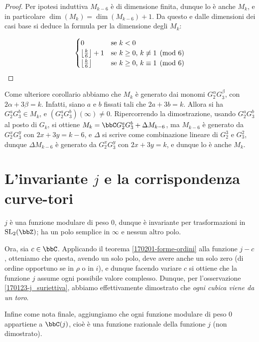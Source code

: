 \begin{proof}
	Per ipotesi induttiva $M_{k-6}$ è di dimensione finita, dunque lo è anche $M_k$, e in particolare $\dim(M_k)=\dim(M_{k-6})+1$.
	Da questo e dalle dimensioni dei casi base si deduce la formula per la dimensione degli $M_k$:
	
	\begin{equation*}
		\begin{cases}
			0 						&	\text{se $k<0$}\\
			\left\lfloor \frac{k}{6} \right\rfloor +1	&	\text{se $k\geq0$, $k\not\equiv1\pmod{6}$}\\
			\left\lfloor \frac{k}{6} \right\rfloor		&	\text{se $k\geq0$, $k\equiv1\pmod{6}$}
		\end{cases}
	\end{equation*}

\end{proof}

Come ulteriore corollario abbiamo che $M_k$ è generato dai monomi $G_2^\alpha G_3^\beta$, con $2\alpha+3\beta=k$.
Infatti, siano $a$ e $b$ fissati tali che $2a+3b=k$.
Allora si ha $G_2^a G_3^b\in M_k$, e $(G_2^a G_3^b)(\infty)\neq0$.
Ripercorrendo la dimostrazione, usando $G_2^a G_3^b$ al posto di $G_k$, si ottiene $M_k=\bbC G_2^a G_3^b + \Delta M_{k-6}$, ma $M_{k-6}$ è generato da $G_2^x G_3^y$ con $2x+3y=k-6$, e $\Delta$ si scrive come combinazione lineare di $G_2^3$ e $G_3^2$, dunque $\Delta M_{k-6}$ è generato da $G_2^x G_3^y$ con $2x+3y=k$, e dunque lo è anche $M_k$.


\section{L'invariante $j$ e la corrispondenza curve-tori}

$j$ è una funzione modulare di peso $0$, dunque è invariante per trasformazioni in $\SL_2(\bbZ)$; ha un polo semplice in $\infty$ e nessun altro polo.

Ora, sia $c \in \bbC$. Applicando il teorema \ref{170201-forme-ordini} alla funzione $j-c$, otteniamo che questa, avendo un solo polo, deve avere anche un solo zero (di ordine opportuno se in $\rho$ o in $i$), e dunque facendo variare $c$ si ottiene che la funzione $j$ assume ogni possibile valore complesso. Dunque, per l'osservazione \ref{170123-j_suriettiva}, abbiamo effettivamente dimostrato che \emph{ogni cubica viene da un toro}.

Infine come nota finale, aggiungiamo che ogni funzione modulare di peso $0$ appartiene a $\bbC(j)$, cioè è una funzione razionale della funzione $j$ (non dimostrato).

